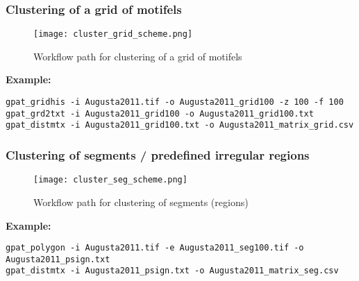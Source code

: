 \FloatBarrier

\subsubsection{Clustering of a grid of motifels}

\begin{figure}[H]
	\centering
	\texttt{[image: cluster\_grid\_scheme.png]}
	\caption{Workflow path for clustering of a grid of motifels}
	\label{FIG:CLUSTER_GRID}
\end{figure}

{\bf Example:}

\begin{minipage}{\linewidth}
\begin{lstlisting}
gpat_gridhis -i Augusta2011.tif -o Augusta2011_grid100 -z 100 -f 100
gpat_grd2txt -i Augusta2011_grid100 -o Augusta2011_grid100.txt
gpat_distmtx -i Augusta2011_grid100.txt -o Augusta2011_matrix_grid.csv
\end{lstlisting}
\end{minipage}

\FloatBarrier

\subsubsection{Clustering of segments / predefined irregular regions}

\begin{figure}[H]
	\centering
	\texttt{[image: cluster\_seg\_scheme.png]}
	\caption{Workflow path for clustering of segments (regions)}
	\label{FIG:CLUSTER_SEGMENT}
\end{figure}

{\bf Example:}

\begin{minipage}{\linewidth}
\begin{lstlisting}
gpat_polygon -i Augusta2011.tif -e Augusta2011_seg100.tif -o Augusta2011_psign.txt
gpat_distmtx -i Augusta2011_psign.txt -o Augusta2011_matrix_seg.csv
\end{lstlisting}
\end{minipage}

